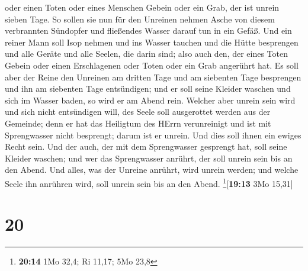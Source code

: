 oder einen Toten oder eines Menschen Gebein oder ein Grab, der ist
unrein sieben Tage.  So sollen sie nun für den Unreinen
nehmen Asche von diesem verbrannten Sündopfer und fließendes Wasser
darauf tun in ein Gefäß.  Und ein reiner Mann soll Isop
nehmen und ins Wasser tauchen und die Hütte besprengen und alle Geräte
und alle Seelen, die darin sind; also auch den, der eines Toten Gebein
oder einen Erschlagenen oder Toten oder ein Grab angerührt hat.
 Es soll aber der Reine den Unreinen am dritten Tage und
am siebenten Tage besprengen und ihn am siebenten Tage entsündigen; und
er soll seine Kleider waschen und sich im Wasser baden, so wird er am
Abend rein.  Welcher aber unrein sein wird und sich nicht
entsündigen will, des Seele soll ausgerottet werden aus der Gemeinde;
denn er hat das Heiligtum des HErrn verunreinigt und ist mit
Sprengwasser nicht besprengt; darum ist er unrein.  Und
dies soll ihnen ein ewiges Recht sein. Und der auch, der mit dem
Sprengwasser gesprengt hat, soll seine Kleider waschen; und wer das
Sprengwasser anrührt, der soll unrein sein bis an den Abend.
 Und alles, was der Unreine anrührt, wird unrein werden;
und welche Seele ihn anrühren wird, soll unrein sein bis an den Abend.
\footnote{\textbf{20:14} 1Mo 32,4; Ri 11,17; 5Mo 23,8}{[}\textbf{19:13}
3Mo 15,31{]}

\hypertarget{section-19}{%
\section{20}\label{section-19}}

